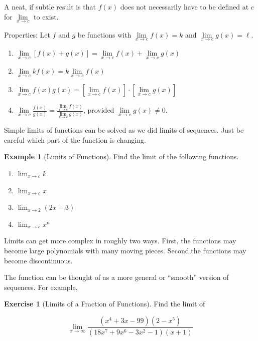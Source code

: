 \documentclass[
]{book}
\providecommand{\tightlist}{%
  \setlength{\itemsep}{0pt}\setlength{\parskip}{0pt}}
\theoremstyle{definition}
\theoremstyle{definition}
\newtheorem{example}{Example}[chapter]
\theoremstyle{definition}
\newtheorem{exercise}{Exercise}[chapter]
\theoremstyle{definition}
\theoremstyle{remark}
\begin{document}
A neat, if subtle result is that \(f(x)\) does not necessarily have to be defined at \(c\) for \(\lim\limits_{x \to c}\) to exist.

Properties: Let \(f\) and \(g\) be functions with \(\lim\limits_{x \to c} f(x)=k\) and \(\lim\limits_{x \to c} g(x)=\ell\).

\begin{enumerate}
\def\labelenumi{\arabic{enumi}.}
\tightlist
\item
  \(\lim\limits_{x \to c}[f(x)+g(x)]=\lim\limits_{x \to c} f(x)+ \lim\limits_{x \to c} g(x)\)
\item
  \(\lim\limits_{x \to c} kf(x) = k\lim\limits_{x \to c} f(x)\)
\item
  \(\lim\limits_{x \to c} f(x) g(x) = \left[\lim\limits_{x \to c} f(x)\right]\cdot \left[\lim\limits_{x \to c} g(x)\right]\)
\item
  \(\lim\limits_{x \to c} \frac{f(x)}{g(x)} = \frac{\lim\limits_{x \to c} f(x)}{\lim\limits_{x \to c} g(x)}\), provided \(\lim\limits_{x \to c} g(x)\ne 0\).
\end{enumerate}

Simple limits of functions can be solved as we did limits of sequences. Just be careful which part of the function is changing.

\begin{example}[Limits of Functions]
\protect\hypertarget{exm:limfun1}{}{\label{exm:limfun1} {} }Find the limit of the following functions.

\begin{enumerate}
\def\labelenumi{\arabic{enumi}.}
\tightlist
\item
  \(\lim_{x \to c} k\)
\item
  \(\lim_{x \to c} x\)
\item
  \(\lim_{x\to 2} (2x-3)\)
\item
  \(\lim_{x \to c} x^n\)
\end{enumerate}
\end{example}

Limits can get more complex in roughly two ways. First, the functions may become large polynomials with many moving pieces. Second,the functions may become discontinuous.

The function can be thought of as a more general or ``smooth'' version of sequences. For example,

\begin{exercise}[Limits of a Fraction of Functions]
\protect\hypertarget{exr:limfunmax}{}{\label{exr:limfunmax} {} }
Find the limit of

\[\lim_{x\to\infty} \frac{(x^4 +3x−99)(2−x^5)}{(18x^7 +9x^6 −3x^2 −1)(x+1)}\]
\end{exercise}
\end{document}
